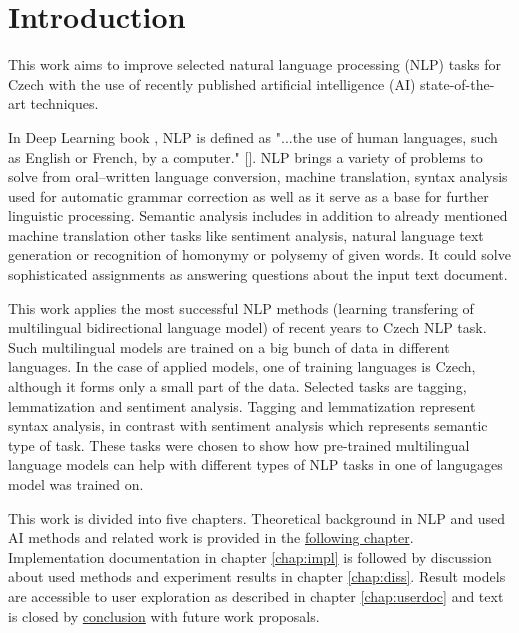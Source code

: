 \chapter*{Introduction}

This work aims to improve selected natural language processing (NLP) tasks for Czech %
 with the use of recently published artificial intelligence (AI) state-of-the-art techniques. 
 
 In Deep Learning book %
, NLP is defined as "...the use of human languages, such as English or French, by a computer." \cite{Goodfellow-et-al-2016}[]. NLP brings a variety of problems to solve from oral--written language conversion, machine translation, syntax analysis used for automatic grammar correction as well as it serve as a base for further linguistic processing. Semantic analysis includes in addition to already mentioned machine translation other tasks like sentiment analysis, natural language text generation or recognition of homonymy or polysemy of given words. It could solve sophisticated assignments as answering questions about the input text document.
\par

This work applies the most successful NLP methods (learning transfering of multilingual bidirectional language model) of recent years to Czech NLP task. Such multilingual models are trained on a big bunch of data in different languages. In the case of applied models, one of training languages is Czech, although it forms only a small part of the data. %
Selected tasks are tagging, lemmatization and sentiment analysis. Tagging and lemmatization represent syntax analysis, in contrast with sentiment analysis which represents semantic type of task. %
These tasks were chosen to show how pre-trained multilingual language models can help with different types of NLP tasks in one of langugages model was trained on. 

\par
This work is divided into five chapters. Theoretical background in NLP and used AI methods and related work is provided in the \hyperref[chap:theandme]{following chapter}.
Implementation documentation in chapter \ref{chap:impl} is followed by discussion about used methods and experiment results in chapter \ref{chap:diss}. Result models are accessible to user exploration as described in chapter \ref{chap:userdoc} and text is closed by \hyperref[chap:concl]{conclusion} with future work proposals.


